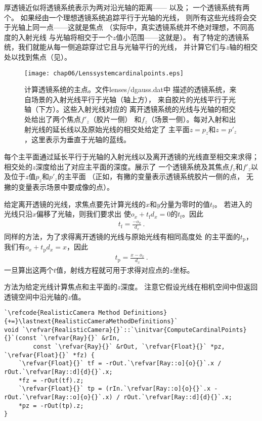 厚透镜近似将透镜系统表示为两对沿光轴的距离——
以及；
一个透镜系统有两个。
如果经由一个理想透镜系统追踪平行于光轴的光线，
则所有这些光线将会交于光轴上同一点——这就是焦点
（实际中，真实透镜系统并不绝对理想，不同高度的入射光线
与光轴将相交于一个$z$值小范围——这就是）。
有了特定的透镜系统，我们就能从每一侧追踪穿过它且与光轴平行的光线，
并计算它们与$z$轴的相交处以找到焦点（见）。
\begin{figure}[htbp]
    \centering\texttt{[image: chap06/Lenssystemcardinalpoints.eps]}
    \caption{计算透镜系统的主点。文件{\ttfamily lenses/dgauss.dat}中
    描述的透镜系统，来自场景的入射光线平行于光轴（轴上方），
    来自胶片的光线平行于光轴（下方）。这些入射光线对应的
    离开透镜系统的光线与光轴的相交处给出了两个焦点$f'_z$（胶片一侧）
    和$f_z$（场景一侧）。每对入射和出射光线的延长线以及原始光线的相交处给定了
    主平面$z=p_z$和$z=p'_z$，这里表示为垂直于光轴的蓝线。}
    \label{fig:6.20}
\end{figure}

每个主平面通过延长平行于光轴的入射光线以及离开透镜的光线直至相交来求得；
相交处的$z$深度给出了对应主平面的深度。展示了
一个透镜系统及其焦点$f_z$和$f'_z$以及位于$z$值$p_z$和$p'_z$的主平面
（正如，有撇的变量表示透镜系统胶片一侧的点，
无撇的变量表示场景中要成像的点）。

给定离开透镜的光线，求焦点要先计算光线的$x$和$y$分量为零时的值$t_{\mathrm{f}}$。
若进入的光线只沿$x$偏移了光轴，则我们要求出
使$o_x+t_{\mathrm{f}}d_x=0$的$t_{\mathrm{f}}$。因此
\begin{align*}
    t_{\mathrm{f}}=\frac{-o_x}{d_x}\, .
\end{align*}
同样的方法，为了求得离开透镜的光线与原始光线有相同高度处
的主平面的$t_{\mathrm{p}}$，我们有$o_x+t_{\mathrm{p}}d_x=x$，因此
\begin{align*}
    t_{\mathrm{p}}=\frac{x-o_x}{d_x}\, .
\end{align*}
一旦算出这两个$t$值，射线方程就可用于求得对应点的$z$坐标。

方法为给定光线计算焦点和主平面的$z$深度。
注意它假设光线在相机空间中但返回透镜空间中沿光轴的$z$值。
\begin{lstlisting}
`\refcode{RealisticCamera Method Definitions}{+=}\lastnext{RealisticCameraMethodDefinitions}`
void `\refvar{RealisticCamera}{}`::`\initvar{ComputeCardinalPoints}{}`(const `\refvar{Ray}{}` &rIn,
        const `\refvar{Ray}{}` &rOut, `\refvar{Float}{}` *pz, `\refvar{Float}{}` *fz) {
    `\refvar{Float}{}` tf = -rOut.`\refvar[Ray::o]{o}{}`.x / rOut.`\refvar[Ray::d]{d}{}`.x;
    *fz = -rOut(tf).z;
    `\refvar{Float}{}` tp = (rIn.`\refvar[Ray::o]{o}{}`.x - rOut.`\refvar[Ray::o]{o}{}`.x) / rOut.`\refvar[Ray::d]{d}{}`.x;
    *pz = -rOut(tp).z;
}
\end{lstlisting}

